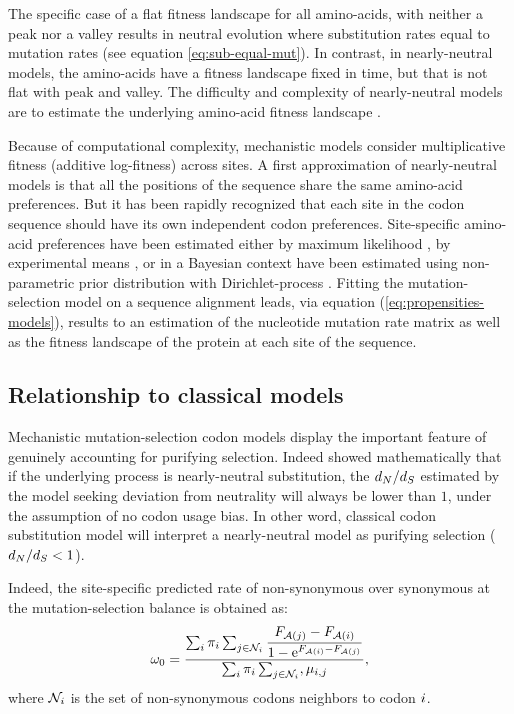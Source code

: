 The specific case of a flat fitness landscape for all amino-acids, with neither a peak nor a valley results in \gls{neutral} evolution where \gls{substitution} rates equal to mutation rates (see equation \ref{eq:sub-equal-mut}).
In contrast, in \gls{nearly-neutral} models, the amino-acids have a fitness landscape fixed in time, but that is not flat with peak and valley.
The difficulty and complexity of \gls{nearly-neutral} models are to estimate the underlying amino-acid fitness landscape \citep{Halpern1998}.

Because of computational complexity, mechanistic models consider multiplicative fitness (additive log-fitness) across sites.
A first approximation of \gls{nearly-neutral} models is that all the positions of the sequence share the same amino-acid preferences.
But it has been rapidly recognized that each site in the \gls{codon} sequence should have its own independent \gls{codon} preferences.
Site-specific amino-acid preferences have been estimated either by maximum \gls{likelihood} \citep{Tamuri2012,Tamuri2014}, by experimental means \citep{Bloom2017}, or in a Bayesian context have been estimated using non-parametric
prior distribution with \gls{Dirichlet-process} \citep{Rodrigue2010, Rodrigue2014}.
Fitting the mutation-selection model on a sequence alignment leads, via equation (\ref{eq:propensities-models}), results to an estimation of the nucleotide mutation rate matrix as well as the fitness landscape of the protein at each site of the sequence.

\subsection{Relationship to classical models}
Mechanistic mutation-selection \gls{codon} models display the important feature of genuinely accounting for purifying selection.
Indeed \citet{Spielman2015} showed mathematically that if the underlying process is \gls{nearly-neutral} \gls{substitution}, the $d_N / d_S$ estimated by the model seeking deviation from neutrality will always be lower than $1$, under the assumption of no \gls{codon} usage bias.
In other word, classical \gls{codon} \gls{substitution} model will interpret a \gls{nearly-neutral} model as purifying selection ($d_N / d_S < 1$).

Indeed, the site-specific predicted rate of non-synonymous over \gls{synonymous} at the mutation-selection balance is obtained as: 
\begin{equation}
\omega_0 = \dfrac{ \sum_{i} \pi_{i} \sum_{j \in \mathcal{N}_{{i}}} \dfrac{F_{\mathcal{A}({j})} - F_{\mathcal{A}({i})}}{1 - \mathrm{e}^{F_{\mathcal{A}({i})} - F_{\mathcal{A}({j})}} }}{\sum_{i} \pi_{i} \sum_{j \in \mathcal{N}_{{i}} }, \mu_{{i}, {j}}},
\end{equation}
where $\mathcal{N}_{{i}}$ is the set of non-synonymous \glspl{codon} neighbors to \gls{codon} ${i}$.

